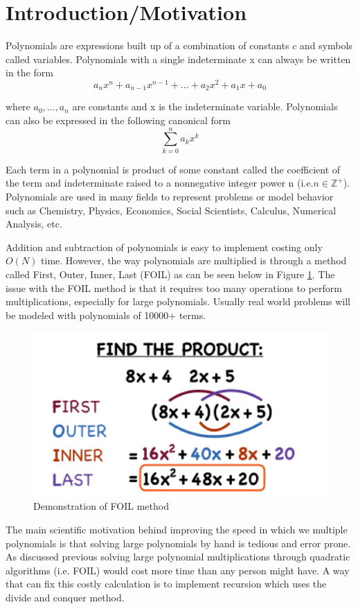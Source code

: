 \documentclass[12pt]{article}
\begin{document}
        \section{Introduction/Motivation}
        \indent\par{Polynomials are expressions built up of a combination of constants $c$ and symbols called variables. Polynomials with a single indeterminate x can always be written in the form }
        $$a_nx^n + a_{n-1}x^{n-1} + ... + a_2x^2 + a_1x + a_0$$
        \par{where $a_0,...,a_n$ are constants and x is the indeterminate variable. Polynomials can also be expressed in the following canonical form}
        $$ \sum_{k=0}^{n}a_kx^k $$
        \indent\par{Each term in a polynomial is product of some constant called the coefficient of the term and indeterminate raised to a nonnegative integer power n (i.e.$n\in\mathbb{Z}^+$). Polynomials are used in many fields to represent problems or model behavior such as Chemistry, Physics, Economics, Social Scientists, Calculus, Numerical Analysis, etc.}
        \indent\par{Addition and subtraction of polynomials is easy to implement costing only $O(N)$ time. However, the way polynomials are multiplied is through a method called First, Outer, Inner, Last (FOIL) as can be seen below in Figure \ref{fig:foil}. The issue with the FOIL method is that it requires too many operations to perform multiplications, especially for large polynomials. Usually real world problems will be modeled with polynomials of 10000+ terms.}
        \begin{figure}[H]
        	\centerline{\includegraphics[scale=0.5]{images/FOIL}}
        	\caption{Demonstration of FOIL method}
        	\label{fig:foil}
        \end{figure}
    	\indent\par{The main scientific motivation behind improving the speed in which we multiple polynomials is that solving large polynomials by hand is tedious and error prone. As discussed previous solving large polynomial multiplications through quadratic algorithms (i.e. FOIL) would cost more time than any person might have. A way that can fix this costly calculation is to implement recursion which uses the divide and conquer method.}
    	  
\end{document}
